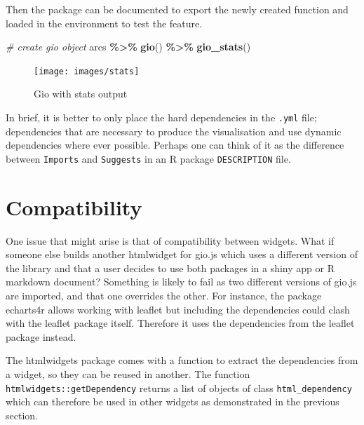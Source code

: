 \documentclass[
  10pt,
]{krantz}
\makeatletter
\newenvironment{Shaded}{\begin{snugshade}}{\end{snugshade}}
\newcommand{\CommentTok}[1]{\textcolor[rgb]{0.37,0.37,0.37}{\textit{#1}}}
\newcommand{\KeywordTok}[1]{\textcolor[rgb]{0.27,0.27,0.27}{\textbf{#1}}}
\newcommand{\NormalTok}[1]{#1}
\newcommand{\OperatorTok}[1]{\textcolor[rgb]{0.43,0.43,0.43}{\textbf{#1}}}
\newcommand{\StringTok}[1]{\textcolor[rgb]{0.5,0.5,0.5}{#1}}
\newenvironment{kframe}{%
\medskip{}
\setlength{\fboxsep}{.8em}
 \def\at@end@of@kframe{}%
 \ifinner\ifhmode%
  \def\at@end@of@kframe{\end{minipage}}%
  \begin{minipage}{\columnwidth}%
 \fi\fi%
 \def\FrameCommand##1{\hskip\@totalleftmargin \hskip-\fboxsep
 \colorbox{shadecolor}{##1}\hskip-\fboxsep
     \hskip-\linewidth \hskip-\@totalleftmargin \hskip\columnwidth}%
 \MakeFramed {\advance\hsize-\width
   \@totalleftmargin\z@ \linewidth\hsize
   \@setminipage}}%
 {\par\unskip\endMakeFramed%
 \at@end@of@kframe}
\renewenvironment{Shaded}{\begin{kframe}}{\end{kframe}}
\makeatother
\begin{document}
Then the package can be documented to export the newly created function and loaded in the environment to test the feature.

\begin{Shaded}
\begin{Highlighting}[]
\CommentTok{\# create gio object}
\NormalTok{arcs }\OperatorTok{\%>\%}\StringTok{ }
\StringTok{  }\KeywordTok{gio}\NormalTok{() }\OperatorTok{\%>\%}\StringTok{ }
\StringTok{  }\KeywordTok{gio\_stats}\NormalTok{()}
\end{Highlighting}
\end{Shaded}

\begin{figure}[H]

{\centering \texttt{[image: images/stats]} 

}

\caption{Gio with stats output}\label{fig:gio-stats}
\end{figure}

In brief, it is better to only place the hard dependencies in the \texttt{.yml} file; dependencies that are necessary to produce the visualisation and use dynamic dependencies where ever possible. Perhaps one can think of it as the difference between \texttt{Imports} and \texttt{Suggests} in an R package \texttt{DESCRIPTION} file.

\hypertarget{widgets-adv-compatibility}{%
\section{Compatibility}\label{widgets-adv-compatibility}}

One issue that might arise is that of compatibility between widgets. What if someone else builds another htmlwidget for gio.js which uses a different version of the library and that a user decides to use both packages in a shiny app or R markdown document? Something is likely to fail as two different versions of gio.js are imported, and that one overrides the other. For instance, the package echarts4r \citep{R-echarts4r} allows working with leaflet but including the dependencies could clash with the leaflet package itself. Therefore it uses the dependencies from the leaflet package instead.

The htmlwidgets package comes with a function to extract the dependencies from a widget, so they can be reused in another. The function \texttt{htmlwidgets::getDependency} returns a list of objects of class \texttt{html\_dependency} which can therefore be used in other widgets as demonstrated in the previous section.
\end{document}
